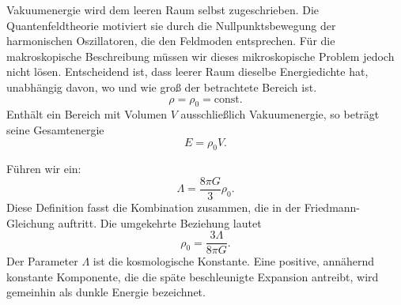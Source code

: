 Vakuumenergie wird dem leeren Raum selbst zugeschrieben. Die Quantenfeldtheorie motiviert sie durch die Nullpunktsbewegung der harmonischen Oszillatoren, die den Feldmoden entsprechen. Für die makroskopische Beschreibung müssen wir dieses mikroskopische Problem jedoch nicht lösen. Entscheidend ist, dass leerer Raum dieselbe Energiedichte hat, unabhängig davon, wo und wie groß der betrachtete Bereich ist.
\begin{equation}
\rho=\rho_0=\text{const.}
\label{eq:c05-vacuum-density}
\end{equation}
Enthält ein Bereich mit Volumen \(V\) ausschließlich Vakuumenergie, so beträgt seine Gesamtenergie
\begin{equation}
E=\rho_0 V.
\end{equation}
\begin{classroomqa}
\end{classroomqa}

Führen wir ein:
\begin{equation}
\Lambda=\frac{8\pi G}{3}\rho_0.
\label{eq:c05-lambda-definition}
\end{equation}
Diese Definition fasst die Kombination zusammen, die in der Friedmann-Gleichung auftritt. Die umgekehrte Beziehung lautet
\begin{equation}
\rho_0=\frac{3\Lambda}{8\pi G}.
\end{equation}
Der Parameter \(\Lambda\) ist die kosmologische Konstante. Eine positive, annähernd konstante Komponente, die die späte beschleunigte Expansion antreibt, wird gemeinhin als dunkle Energie bezeichnet.

